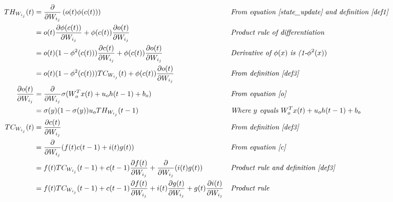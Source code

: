 \documentclass[twoside,11pt]{article}
\begin{document}
\begin{align*}
TH_{W_{i_j}}(t) & = \frac{\partial}{\partial W_{i_j}} \left ( o(t) \phi(c(t)) \right ) && \textit{From equation \ref{state_update} and definition \ref{def1}} \\
& = o(t) \frac{\partial \phi(c(t))}{\partial W_{i_j}}  + \phi(c(t)) \frac{\partial o(t)}{\partial W_{i_j}}   && \textit{Product rule of differentiation} \\
&= o(t) (1-\phi^{2}(c(t))) \frac{\partial c(t)}{\partial W_{i_j}}  + \phi(c(t)) \frac{\partial o(t)}{\partial W_{i_j}}   && \textit{Derivative of $\phi(x)$ is (1-$\phi^2(x))$}\\ 
&= o(t) (1-\phi^{2}(c(t))) TC_{W_{i_j}}(t)  + \phi(c(t)) \frac{\partial o(t)}{\partial W_{i_j}}   && \textit{From definition \ref{def3}}\\ 
\frac{\partial o(t)}{\partial W_{i_j}} &=  \frac{\partial}{\partial W_{i_j}} \sigma(W_{o}^T x(t) + u_{o} h(t-1) + b_o) && \textit{From equation \ref{o}}\\
&= \sigma(y)(1-\sigma(y))u_o TH_{W_{i_j}}(t-1) && \textit{Where $y$ equals $W_{o}^T x(t) + u_{o} h(t-1) + b_o$} \\
TC_{W_{i_j}}(t) &=  \frac{\partial c(t)}{\partial W_{i_j}} && \textit{From definition \ref{def3}} \\ 
&=  \frac{\partial}{\partial W_{i_j}} (f(t)  c(t-1) + i(t) g(t))  && \textit{From equation \ref{c}} \\
&= f(t) TC_{W_{i_j}}(t-1) + c(t-1)\frac{\partial f(t)}{ \partial W_{i_j}} + \frac{\partial}{\partial W_{i_j}} ( i(t) g(t) )   && \textit{Product rule and definition \ref{def3}}\\
&= f(t) TC_{W_{i_j}}(t-1) + c(t-1)\frac{\partial f(t)}{ \partial W_{i_j}} + i(t)\frac{\partial g(t) }{\partial W_{i_j}}  + g(t)\frac{\partial i(t) }{\partial W_{i_j}}  && \textit{Product rule} 
\end{align*}


\end{document}
